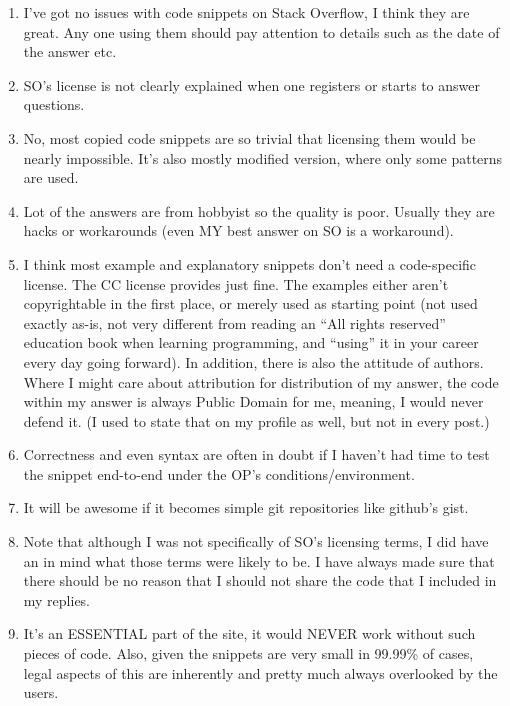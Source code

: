 \documentclass{svjour3}                     %
\begin{document}
\begin{enumerate}
	\item I've got no issues with code snippets on Stack Overflow, I think they are great. Any one using them should pay attention to details such as the date of the answer etc.
	\item SO's license is not clearly explained when one registers or starts to answer questions.
	\item No, most copied code snippets are so trivial that licensing them would be nearly impossible. It's also mostly modified version, where only some patterns are used.
	\item Lot of the answers are from hobbyist so the quality is poor. Usually they are hacks or workarounds (even MY best answer on SO is a workaround).
	\item I think most example and explanatory snippets don't need a code-specific license. The CC license provides just fine. The examples either aren't copyrightable in the first place, or merely used as starting point (not used exactly as-is, not very different from reading an ``All rights reserved'' education book when learning programming, and ``using'' it in your career every day going forward). In addition, there is also the attitude of authors. Where I might care about attribution for distribution of my answer, the code within my answer is always Public Domain for me, meaning, I would never defend it. (I used to state that on my profile as well, but not in every post.)
	\item Correctness and even syntax are often in doubt if I haven't had time to test the snippet end-to-end under the OP's conditions/environment.
	\item It will be awesome if it becomes simple git repositories like github's gist.
	\item Note that although I was not specifically of SO's licensing terms, I did have an in mind what those terms were likely to be. I have always made sure that there should be no reason that I should not share the code that I included in my replies.
	\item It's an ESSENTIAL part of the site, it would NEVER work without such pieces of code. Also, given the snippets are very small in 99.99\% of cases, legal aspects of this are inherently and pretty much always overlooked by the users.
\end{enumerate}
\end{document}
